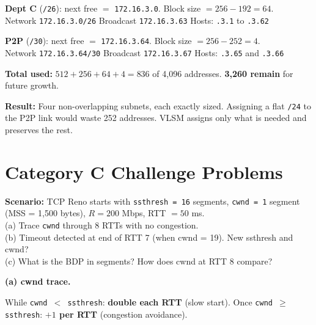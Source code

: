 \documentclass[11pt, letterpaper]{article}
\begin{document}
\textbf{Dept C} (\texttt{/26}): next free $= $ \texttt{172.16.3.0}. Block size $= 256-192 = 64$.\\
Network \texttt{172.16.3.0/26} \quad Broadcast \texttt{172.16.3.63} \quad Hosts: \texttt{.3.1} to \texttt{.3.62}

\textbf{P2P} (\texttt{/30}): next free $= $ \texttt{172.16.3.64}. Block size $= 256-252 = 4$.\\
Network \texttt{172.16.3.64/30} \quad Broadcast \texttt{172.16.3.67} \quad Hosts: \texttt{.3.65} and \texttt{.3.66}

\textbf{Total used:} $512 + 256 + 64 + 4 = 836$ of 4{,}096 addresses. \textbf{3{,}260 remain} for future growth.

\begin{tcolorbox}[colback=partbg, colframe=sectionblue, arc=3pt, boxrule=1pt]
\textbf{Result:} Four non-overlapping subnets, each exactly sized. Assigning a flat
\texttt{/24} to the P2P link would waste 252 addresses. VLSM assigns only what is
needed and preserves the rest.
\end{tcolorbox}

\newpage

\section*{Category C \quad Challenge Problems}

\begin{tcolorbox}[colback=part3bg, colframe=sectionpurple,
  title={\bfseries Problem C1 --- Congestion Control Trace: cwnd Over Time}, arc=3pt, boxrule=1pt]
\textbf{Scenario:} TCP Reno starts with \texttt{ssthresh = 16} segments, \texttt{cwnd = 1}
segment (MSS = 1{,}500 bytes), $R = 200$ Mbps, RTT $= 50$ ms.\\
(a) Trace \texttt{cwnd} through 8 RTTs with no congestion.\\
(b) Timeout detected at end of RTT 7 (when cwnd = 19). New ssthresh and cwnd?\\
(c) What is the BDP in segments? How does cwnd at RTT 8 compare?
\end{tcolorbox}

\textbf{(a) cwnd trace.}

While \texttt{cwnd $<$ ssthresh}: \textbf{double each RTT} (slow start).
Once \texttt{cwnd $\geq$ ssthresh}: \textbf{$+1$ per RTT} (congestion avoidance).
\end{document}
